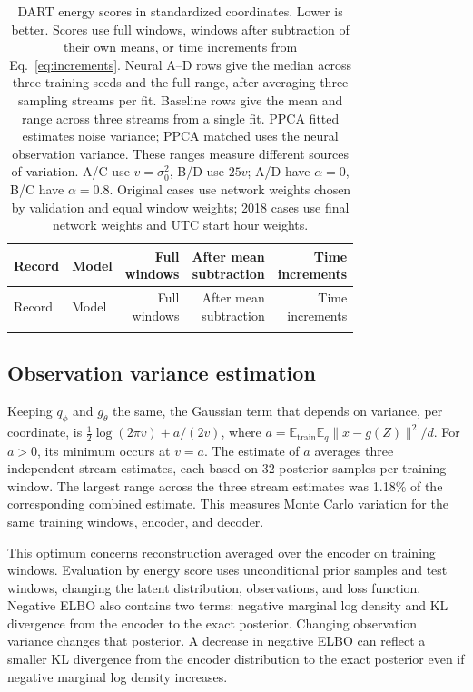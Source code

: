\documentclass{article}
\newcommand{\E}{\mathbb{E}}
\begin{document}
\begingroup
\setlength{\tabcolsep}{3pt}
\begin{longtable}{llrrr}
\caption{DART energy scores in standardized coordinates. Lower is better. Scores use full windows, windows after subtraction of their own means, or time increments from Eq.~\ref{eq:increments}. Neural A--D rows give the median across three training seeds and the full range, after averaging three sampling streams per fit. Baseline rows give the mean and range across three streams from a single fit. PPCA fitted estimates noise variance; PPCA matched uses the neural observation variance. These ranges measure different sources of variation. A/C use $v=\sigma_0^2$, B/D use $25v$; A/D have $\alpha=0$, B/C have $\alpha=0.8$. Original cases use network weights chosen by validation and equal window weights; 2018 cases use final network weights and UTC start hour weights.}\label{tab:dart_energy}\\
\toprule
Record & Model & \shortstack{Full\\windows} & \shortstack{After mean\\subtraction} & \shortstack{Time\\increments}\\
\midrule
\endfirsthead
\toprule
Record & Model & \shortstack{Full\\windows} & \shortstack{After mean\\subtraction} & \shortstack{Time\\increments}\\
\midrule
\endhead
\\
\bottomrule
\end{longtable}
\endgroup

\subsection{Observation variance estimation}
\label{sec:variance_reset}
Keeping $q_\phi$ and $g_\theta$ the same, the Gaussian term that depends on variance, per coordinate, is $\tfrac12\log(2\pi v)+a/(2v)$, where $a=\E_{\mathrm{train}}\E_q\|x-g(Z)\|^2/d$. For $a>0$, its minimum occurs at $v=a$. The estimate of $a$ averages three independent stream estimates, each based on 32 posterior samples per training window. The largest range across the three stream estimates was 1.18\% of the corresponding combined estimate. This measures Monte Carlo variation for the same training windows, encoder, and decoder.

This optimum concerns reconstruction averaged over the encoder on training windows. Evaluation by energy score uses unconditional prior samples and test windows, changing the latent distribution, observations, and loss function. Negative ELBO also contains two terms: negative marginal log density and KL divergence from the encoder to the exact posterior. Changing observation variance changes that posterior. A decrease in negative ELBO can reflect a smaller KL divergence from the encoder distribution to the exact posterior even if negative marginal log density increases.
\end{document}
